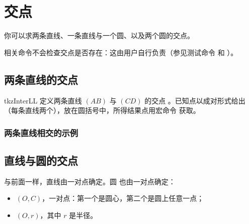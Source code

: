 \section{交点}

你可以求两条直线、一条直线与一个圆、以及两个圆的交点。

相关命令不会检查交点是否存在：这由用户自行负责（参见测试命令  和 ）。

\subsection{两条直线的交点 }
\begin{NewMacroBox}{tkzInterLL}{}%
定义两条直线 $(AB)$ 与 $(CD)$ 的交点 。已知点以成对形式给出（每条直线两个），放在圆括号中，所得结果点用宏命令  获取。
\end{NewMacroBox}

\subsubsection{两条直线相交的示例}

\begin{tkzexample}[latex=7cm,small]
\end{tkzexample}

\subsection{直线与圆的交点  }

与前面一样，直线由一对点确定。圆
 也由一对点确定：
\begin{itemize}
\item $(O,C)$，一对点：第一个是圆心，第二个是圆上任意一点；
\item $(O,r)$，其中 $r$ 是半径。
\end{itemize}

